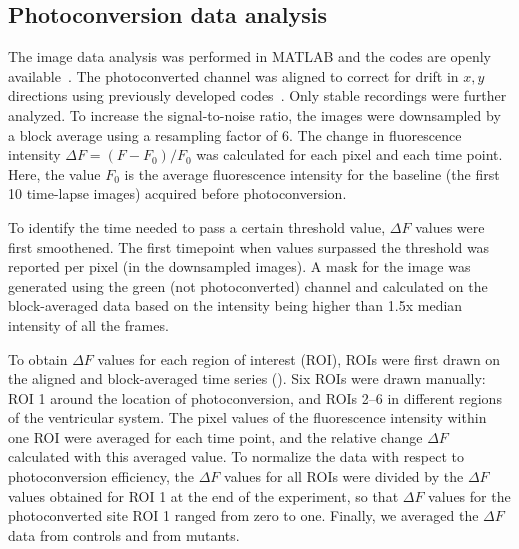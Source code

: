 \documentclass{WileyMSP-template}
\begin{document}
\subsection{Photoconversion data analysis}
The image data analysis was performed in MATLAB and the codes are
openly available~.  The
photoconverted channel was aligned to correct for drift in $x,y$
directions using previously developed
codes~\cite{Reiten2017Motile-Cilia-MediatedComputations,
  Ringers2023NovelEpithelia}.  Only stable recordings were further
analyzed.  To increase the signal-to-noise ratio, the images were
downsampled by a block average using a resampling factor of 6. 
The change in fluorescence intensity
$\Delta F = (F-F_0)/F_0$ was
calculated for each pixel and each time point.  Here, the
value $F_0$ is the average fluorescence intensity for the baseline
(the first 10 time-lapse images) acquired before photoconversion.

To identify the time needed to pass a certain threshold value,
$\Delta F$ values were first smoothened.
The first timepoint when values surpassed the threshold was reported
per pixel (in the downsampled images).
A mask for the image was generated using the green (not photoconverted)
channel and calculated on the block-averaged data based on the intensity
being higher than 1.5x median intensity of all the frames.

To obtain $\Delta F$ values for each region of interest (ROI), ROIs were
first drawn on the aligned and block-averaged time series ().
Six ROIs were drawn manually: ROI 1 around the location of photoconversion,
and ROIs 2--6 in different regions of the ventricular system.
The pixel values of the fluorescence intensity within one ROI were
averaged for each time point, and the relative change $\Delta F$ calculated with this averaged value.
To normalize the data with respect to photoconversion efficiency, the
$\Delta F$ values for all ROIs were divided by the $\Delta F$ values
obtained for ROI 1 at the end of the experiment,
so that $\Delta F$ values for the photoconverted site ROI 1 ranged from
zero to one. Finally, we averaged the $\Delta F$ data from controls and from mutants.
\end{document}
